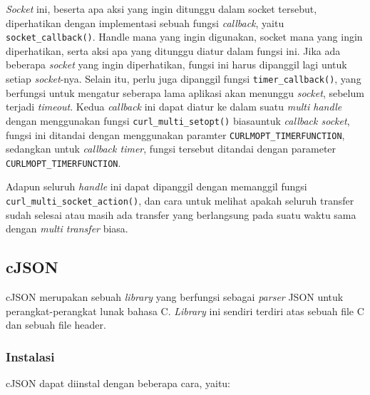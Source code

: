 \textit{Socket} ini, beserta apa aksi yang ingin ditunggu dalam socket tersebut, diperhatikan dengan implementasi sebuah fungsi \textit{callback}, yaitu \verb|socket_callback()|. Handle mana yang ingin digunakan, socket mana yang ingin diperhatikan, serta aksi apa yang ditunggu diatur dalam fungsi ini. Jika ada beberapa \textit{socket} yang ingin diperhatikan, fungsi ini harus dipanggil lagi untuk setiap \textit{socket}-nya. Selain itu, perlu juga dipanggil fungsi \verb|timer_callback()|, yang berfungsi untuk mengatur seberapa lama aplikasi akan menunggu \textit{socket}, sebelum terjadi \textit{timeout}. Kedua \textit{callback} ini dapat diatur ke dalam suatu \textit{multi handle} dengan menggunakan fungsi \verb|curl_multi_setopt()| biasa\textemdash untuk \textit{callback socket}, fungsi ini ditandai dengan menggunakan paramter \verb|CURLMOPT_TIMERFUNCTION|, sedangkan untuk \textit{callback timer}, fungsi tersebut ditandai dengan parameter \verb|CURLMOPT_TIMERFUNCTION|.

Adapun seluruh \textit{handle} ini dapat dipanggil dengan memanggil fungsi \verb|curl_multi_socket_action()|, dan cara untuk melihat apakah seluruh transfer sudah selesai atau masih ada transfer yang berlangsung pada suatu waktu sama dengan \textit{multi transfer} biasa.

\subsection{cJSON\protect\footnotemark}
\label{sec:cmodules-cJSON}

cJSON merupakan sebuah \textit{library} yang berfungsi sebagai \textit{parser} JSON untuk perangkat-perangkat lunak bahasa C. \textit{Library} ini sendiri terdiri atas sebuah file C dan sebuah file header.

\subsubsection{Instalasi}
\label{sec:cmodules-cJSON-instalation}

cJSON dapat diinstal dengan beberapa cara, yaitu:

